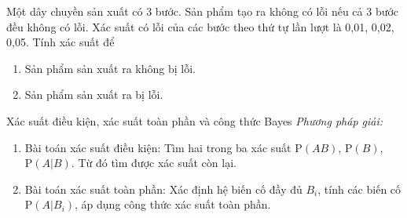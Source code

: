 \begin{bt}%
	Một dây chuyền sản xuất có 3 bước. Sản phẩm tạo ra không có lỗi nếu cả 3 bước đều không có lỗi. Xác suất có lỗi của các bước theo thứ tự lần lượt là 0,01, 0,02, 0,05. Tính xác suất để 
	\begin{enumerate}[\indent a.]
		\item Sản phẩm sản xuất ra không bị lỗi.
		\item Sản phẩm sản xuất ra bị lỗi.
	\end{enumerate}
\end{bt}

\begin{dang}{Xác suất điều kiện, xác suất toàn phần và công thức Bayes}
	\textit{Phương pháp giải:}
	\begin{enumerate}
		\item Bài toán xác suất điều kiện: Tìm hai trong ba xác suất $\mathrm{P}(AB)$, $\mathrm{P}(B)$, $\mathrm{P}(A|B)$. Từ đó tìm được xác suất còn lại.
		\item Bài toán xác suất toàn phần: Xác định hệ biến cố đầy đủ $B_i$, tính các biến cố $\mathrm{P}(A|B_i)$, áp dụng công thức xác suất toàn phần.
		
	\end{enumerate}
\end{dang}



